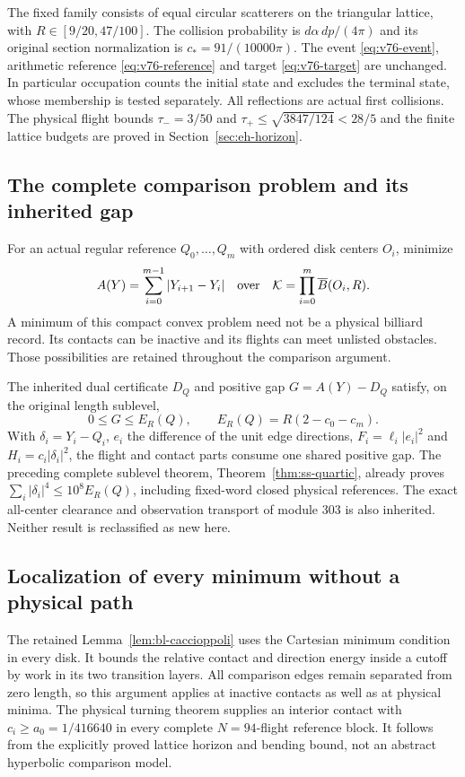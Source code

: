 \documentclass[11pt,reqno]{amsart}
\numberwithin{equation}{section}
\theoremstyle{definition}\newtheorem{definition}[theorem]{Definition}
\theoremstyle{remark}\newtheorem{remark}[theorem]{Remark}
\begin{document}
The fixed family consists of equal circular scatterers on the
triangular lattice, with $R\in[9/20,47/100]$.  The collision
probability is $d\alpha\,dp/(4\pi)$ and its original section
normalization is $c_*=91/(10000\pi)$.  The event
\eqref{eq:v76-event}, arithmetic reference \eqref{eq:v76-reference}
and target \eqref{eq:v76-target} are unchanged.  In particular
occupation counts the initial state and excludes the terminal
state, whose membership is tested separately.  All reflections are
actual first collisions.  The physical flight bounds
$\tau_-=3/50$ and $\tau_+\le\sqrt{3847/124}<28/5$ and the finite
lattice budgets are proved in Section~\ref{sec:eh-horizon}.



\subsection*{The complete comparison problem and its inherited gap}
For an actual regular reference $Q_0,\ldots,Q_m$ with ordered
disk centers $O_i$, minimize
\[
 A(Y)=\sum_{i=0}^{m-1}|Y_{i+1}-Y_i|
 \quad\hbox{over}\quad
 \mathcal K=\prod_{i=0}^{m}\overline B(O_i,R).
\]
A minimum of this compact convex problem need not be a physical
billiard record.  Its contacts can be inactive and its flights can
meet unlisted obstacles.  Those possibilities are retained throughout
the comparison argument.

The inherited dual certificate $D_Q$ and positive gap
$G=A(Y)-D_Q$ satisfy, on the original length sublevel,
\[
 0\le G\le E_R(Q),\qquad E_R(Q)=R(2-c_0-c_m).
\]
With $\delta_i=Y_i-Q_i$, $e_i$ the difference of the unit edge
directions, $F_i=\ell_i|e_i|^2$ and
$H_i=c_i|\delta_i|^2$, the flight and contact parts consume one
shared positive gap.  The preceding complete sublevel theorem,
Theorem~\ref{thm:ss-quartic}, already proves
$\sum_i|\delta_i|^4\le10^8E_R(Q)$, including fixed-word closed
physical references.  The exact all-center clearance and observation
transport of module 303 is also inherited.  Neither result is
reclassified as new here.

\subsection*{Localization of every minimum without a physical path}
The retained Lemma~\ref{lem:bl-caccioppoli} uses the Cartesian minimum
condition in every disk.  It bounds the relative contact and
direction energy inside a cutoff by work in its two transition
layers.  All comparison edges remain separated from zero length,
so this argument applies at inactive contacts as well as at
physical minima.  The physical turning theorem supplies an
interior contact with $c_i\ge a_0=1/416640$ in every complete
$N=94$-flight reference block.  It follows from the explicitly
proved lattice horizon and bending bound, not an abstract
hyperbolic comparison model.
\end{document}
